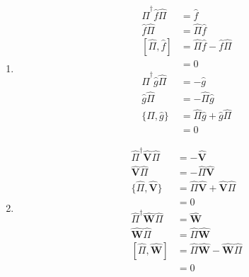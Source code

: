 \documentclass{article}
\renewcommand{\vec}[1]{\boldsymbol{\mathbf{#1}}}
\newcommand{\uvec}[1]{\hat{\vec{#1}}}
\begin{document}
\begin{enumerate}
  \item

        \begin{align*}
          \hat{\Pi}^\dagger \hat{f} \hat{\Pi} & = \hat{f}                               \\
          \hat{f} \hat{\Pi}                   & = \hat{\Pi} \hat{f}                     \\
          [\hat{\Pi}, \hat{f}]                & = \hat{\Pi} \hat{f} - \hat{f} \hat{\Pi} \\
                                              & = 0                                     \\
          \hat{\Pi}^\dagger \hat{g} \hat{\Pi} & = -\hat{g}                              \\
          \hat{g} \hat{\Pi}                   & = -\hat{\Pi} \hat{g}                    \\
          \{ \hat{\Pi}, \hat{g} \}            & = \hat{\Pi} \hat{g} + \hat{g} \hat{\Pi} \\
                                              & = 0
        \end{align*}

  \item

        \begin{align*}
          \hat{\Pi}^\dagger \uvec{V} \hat{\Pi} & = -\uvec{V}                               \\
          \uvec{V} \hat{\Pi}                   & = -\hat{\Pi} \uvec{V}                     \\
          \{ \hat{\Pi}, \uvec{V} \}            & = \hat{\Pi} \uvec{V} + \uvec{V} \hat{\Pi} \\
                                               & = 0                                       \\
          \hat{\Pi}^\dagger \uvec{W} \hat{\Pi} & = \uvec{W}                                \\
          \uvec{W} \hat{\Pi}                   & = \hat{\Pi} \uvec{W}                      \\
          [\hat{\Pi}, \uvec{W}]                & = \hat{\Pi} \uvec{W} - \uvec{W} \hat{\Pi} \\
                                               & = 0
        \end{align*}
\end{enumerate}
\end{document}
